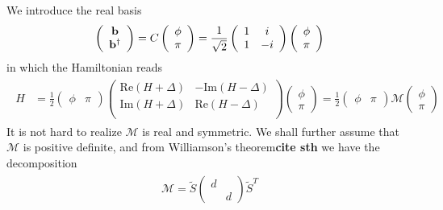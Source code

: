 We introduce the real basis 
\begin{eqnarray}\begin{aligned}
\label{Real basis}
\left(\begin{array}{ccc}
{\bf b}\\
{\bf b}^\dagger
\end{array}\right)
=C\left(\begin{array}{ccc}
\phi\\
\pi
\end{array}\right)
=\frac{1}{\sqrt{2}}\left(\begin{array}{ccc}
1 & i \\
1 & -i
\end{array}\right)\left(\begin{array}{ccc}
\phi\\
\pi
\end{array}\right)
\end{aligned}\end{eqnarray}
in which the Hamiltonian reads
\begin{eqnarray}\begin{aligned}
\hat{H}
&=\frac{1}{2}
\left(\begin{array}{ccc}
\phi & \pi
\end{array}\right)
\left(\begin{array}{ccc}
\text{Re}(H+\Delta) & -\text{Im}(H-\Delta)\\
\text{Im}(H+\Delta)& \text{Re}(H-\Delta) \\
\end{array}\right)
\left(\begin{array}{ccc}
\phi\\
\pi
\end{array}\right)
=\frac{1}{2}
\left(\begin{array}{ccc}
\phi & \pi
\end{array}\right)
\mathcal{M}
\left(\begin{array}{ccc}
\phi\\
\pi
\end{array}\right)
\end{aligned}\end{eqnarray}
It is not hard to realize $\mathcal{M}$ is real and symmetric. We shall further assume that $\mathcal{M}$ is positive definite, and from Williamson's theorem{\bf\color{red}cite sth} we have the decomposition
\begin{eqnarray}\begin{aligned}
\mathcal{M}=\tilde{S}\left(\begin{array}{ccc}
d\\
&d
\end{array}\right)\tilde{S}^T
\end{aligned}\end{eqnarray}
